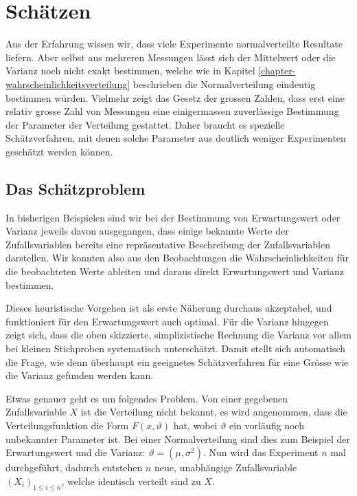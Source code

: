 %
%
%
\chapter{Schätzen} \label{chapter-schaetzen}
Aus der Erfahrung wissen wir, dass viele Experimente normalverteilte Resultate
liefern.
Aber selbst aus mehreren Messungen lässt sich der Mittelwert
oder die Varianz noch nicht exakt bestimmen,
welche wie in Kapitel \ref{chapter-wahrscheinlichkeitsverteilung}
beschrieben die Normalverteilung eindeutig bestimmen würden.
Vielmehr zeigt das Gesetz der grossen Zahlen, dass erst eine
relativ grosse Zahl von Messungen eine einigermassen zuverlässige
Bestimmung der Parameter der Verteilung gestattet.
Daher braucht es spezielle Schätzverfahren, mit denen solche Parameter
aus deutlich weniger Experimenten geschätzt werden können.

\section{Das Schätzproblem} \label{section-schaetzproblem}
In bisherigen Beispielen sind wir bei der Bestimmung von Erwartungswert
oder Varianz jeweils davon ausgegangen, dass einige bekannte Werte der
Zufallsvariablen bereits eine repräsentative Beschreibung der Zufallsvariablen
darstellen.
Wir konnten also aus den Beobachtungen die Wahrscheinlichkeiten
für die beobachteten Werte ableiten und daraus direkt Erwartungswert
und Varianz bestimmen.

Dieses heuristische Vorgehen ist als erste Näherung durchaus akzeptabel,
und funktioniert für den Erwartungswert auch optimal.
Für die Varianz
hingegen zeigt sich, dass die oben skizzierte, simplizistische Rechnung
die Varianz vor allem bei kleinen Stichproben systematisch unterschätzt.
Damit stellt sich automatisch die Frage, wie denn überhaupt ein geeignetes
Schätzverfahren für eine Grösse wie die Varianz gefunden werden kann.

Etwas genauer geht es um folgendes Problem.
Von einer gegebenen Zufallsvariable
$X$ ist die Verteilung nicht bekannt, es wird angenommen, dass die
Verteilungsfunktion die Form $F(x,\vartheta)$ hat, wobei
$\vartheta$ ein vorläufig noch unbekannter Parameter ist.
Bei einer Normalverteilung sind dies zum Beispiel der Erwartungswert und
die Varianz: $\vartheta=(\mu,\sigma^2)$.
Nun wird das
Experiment $n$ mal durchgeführt, dadurch entstehen $n$ neue, unabhängige
Zufallsvariable $(X_i)_{1\le i\le n}$, welche identisch verteilt sind zu
$X$.

